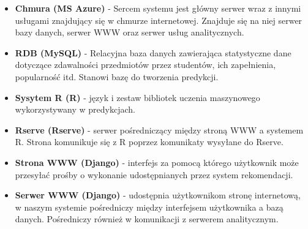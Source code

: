 \documentclass[licencjacka]{pracamgr}
\begin{document}
 \begin{itemize}
 
\item \textbf{Chmura (MS Azure)} - Sercem systemu jest główny serwer wraz z innymi usługami znajdujący się w chmurze internetowej. Znajduje się na niej serwer bazy danych, serwer WWW oraz serwer usług analitycznych.

\item \textbf {RDB (MySQL)} - Relacyjna baza danych zawierająca statystyczne dane dotyczące zdawalności przedmiotów przez studentów, ich zapełnienia, popularność itd. Stanowi bazę do tworzenia predykcji.

\item \textbf{Sysytem R (R)} - język i zestaw bibliotek uczenia maszynowego wykorzystywany w predykcjach.

\item \textbf{Rserve (Rserve)} - serwer pośredniczący między stroną WWW a systemem R. Strona komunikuje się z R
poprzez komunikaty wysyłane do Rserve.
 

\item \textbf{Strona WWW (Django)} - interfejs za pomocą którego użytkownik może przesyłać prośby o wykonanie udostępnianych przez system rekomendacji.

\item \textbf{Serwer WWW (Django)} - udostępnia użytkownikom stronę internetową, w naszym systemie pośredniczy między interfejsem użytkownika a bazą danych. Pośredniczy również w komunikacji z serwerem analitycznym.

  
\end{itemize}
\end{document}
